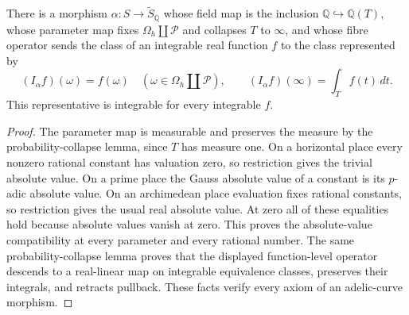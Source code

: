 \begin{example}
\label{ex:adelic-morphism-rational-function}
\leanok
There is a morphism $\alpha:S\to\widetilde S_{\mathbb Q}$ whose field map
is the inclusion $\mathbb Q\hookrightarrow\mathbb Q(T)$, whose parameter
map fixes $\Omega_h\amalg\mathcal P$ and collapses $T$ to $\infty$, and
whose fibre operator sends the class of an integrable real function $f$ to
the class represented by
\[
 (I_\alpha f)(\omega)=f(\omega)\quad
 (\omega\in\Omega_h\amalg\mathcal P),\qquad
 (I_\alpha f)(\infty)=\int_T f(t)\,dt.
\]
This representative is integrable for every integrable $f$.
\end{example}
\begin{proof}
The parameter map is measurable and preserves the measure by the
probability-collapse lemma, since $T$ has measure one. On a horizontal
place every nonzero rational constant has valuation zero, so restriction
gives the trivial absolute value. On a prime place the Gauss absolute value
of a constant is its $p$-adic absolute value. On an archimedean place
evaluation fixes rational constants, so restriction gives the usual real
absolute value. At zero all of these equalities hold because absolute
values vanish at zero. This proves the absolute-value compatibility at
every parameter and every rational number. The same probability-collapse
lemma proves that the displayed function-level operator descends to a
real-linear map on integrable equivalence classes, preserves their
integrals, and retracts pullback. These facts verify every axiom of an
adelic-curve morphism.
\end{proof}
